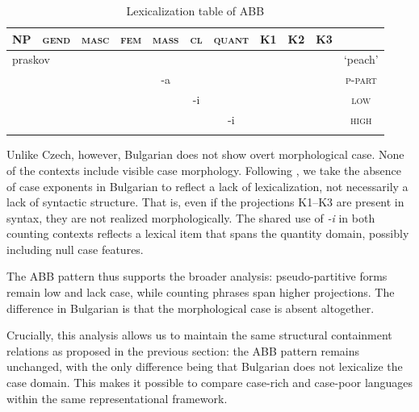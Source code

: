 \documentclass[output=paper,colorlinks,citecolor=brown
]{langscibook}
\begin{document}
\begin{table}
\begin{tabularx}{0.95\textwidth}{ccccccccccc}
\lsptoprule
\textsc{NP}&{\textsc{gend}} & {\textsc{masc}} & {\textsc{fem}} & {\textsc{mass}} & {\textsc{cl}} & {\textsc{quant}} & {\textsc{K1}} & {\textsc{K2}} & {\textsc{K3}}\\
\midrule
\multicolumn{2}{l}{\cellcolor[gray]{0.9}praskov} & {\cellcolor[gray]{0.9}}& {\cellcolor[gray]{0.9}} & {} & {} & {} & {} & {} & {} & {`peach'}\\[.5ex]
\cellcolor[gray]{0.9} & {\cellcolor[gray]{0.9}} & {\cellcolor[gray]{0.9}} &{\cellcolor[gray]{0.8}} & {\cellcolor[gray]{0.8}-a} & {} & {} & {} & {} & {} & {\textsc{p-part}}\\[.5ex]
\cellcolor[gray]{0.9} & {\cellcolor[gray]{0.9}} & {\cellcolor[gray]{0.9}} & {\cellcolor[gray]{0.7}} & {\cellcolor[gray]{0.7}} & {\cellcolor[gray]{0.7}-i} & {} & {} & {} & {} & {\textsc{low}} \\[.5ex]
\cellcolor[gray]{0.9} & {\cellcolor[gray]{0.9}} & {\cellcolor[gray]{0.9}} & {\cellcolor[gray]{0.7}} & {\cellcolor[gray]{0.7}} & {\cellcolor[gray]{0.7}} & {\cellcolor[gray]{0.7}-i} & {} & {} & {} & {\textsc{high}} \\[.5ex]
\lspbottomrule
\end{tabularx}
\caption{Lexicalization table of ABB}
\label{zoha:tab:lexABBcase}
\end{table}

Unlike Czech, however, Bulgarian does not show overt morphological case. None of the contexts include visible case morphology. Following \citet{Caha2009}, we take the absence of case exponents in Bulgarian to reflect a lack of lexicalization, not necessarily a lack of syntactic structure. That is, even if the projections \textsc{K1--K3} are present in syntax, they are not realized morphologically. The shared use of \textit{-i} in both counting contexts reflects a lexical item that spans the quantity domain, possibly including null case features.

The ABB pattern thus supports the broader analysis: pseudo-partitive forms remain low and lack case, while counting phrases span higher projections. The difference in Bulgarian is that the morphological case is absent altogether.

Crucially, this analysis allows us to maintain the same structural containment relations as proposed in the previous section: the ABB pattern remains unchanged, with the only difference being that Bulgarian does not lexicalize the case domain. This makes it possible to compare case-rich and case-poor languages within the same representational framework.
\end{document}
